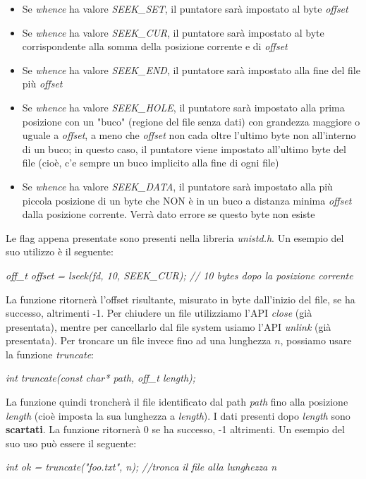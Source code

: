 \documentclass[12pt]{article}
\begin{document}
\begin{itemize}
    \item Se \textit{whence} ha valore \textit{SEEK\_SET}, il puntatore sarà impostato al byte \textit{offset}
    \item Se \textit{whence} ha valore \textit{SEEK\_CUR}, il puntatore sarà impostato al byte corrispondente alla somma della posizione corrente e di \textit{offset}
    \item Se \textit{whence} ha valore \textit{SEEK\_END}, il puntatore sarà impostato alla fine del file più \textit{offset}
    \item Se \textit{whence} ha valore \textit{SEEK\_HOLE}, il puntatore sarà impostato alla prima posizione con un "buco" (regione del file senza dati) con grandezza maggiore o uguale a \textit{offset}, a meno che \textit{offset} non cada oltre l'ultimo byte non all'interno di un buco; in questo caso, il puntatore viene impostato all'ultimo byte del file (cioè, c'e sempre un buco implicito alla fine di ogni file)
    \item Se \textit{whence} ha valore \textit{SEEK\_DATA}, il puntatore sarà impostato alla più piccola posizione di un byte che NON è in un buco a distanza minima \textit{offset} dalla posizione corrente. Verrà dato errore se questo byte non esiste
\end{itemize}
Le flag appena presentate sono presenti nella libreria \textit{unistd.h}.
Un esempio del suo utilizzo è il seguente:
\begin{center}
    \textit{off\_t offset = lseek(fd, 10, SEEK\_CUR); // 10 bytes dopo la posizione corrente}
\end{center}
La funzione ritornerà l'offset risultante, misurato in byte dall'inizio del file, se ha successo, altrimenti -1.
Per chiudere un file utilizziamo l'API \textit{close} (già presentata), mentre per cancellarlo dal file system usiamo l'API \textit{unlink} (già presentata).
Per troncare un file invece fino ad una lunghezza $n$, possiamo usare la funzione \textit{truncate}:
\begin{center}
    \textit{int truncate(const char* path, off\_t length);}
\end{center}
La funzione quindi troncherà il file identificato dal path \textit{path} fino alla posizione \textit{length} (cioè imposta la sua lunghezza a \textit{length}).
I dati presenti dopo \textit{length} sono \textbf{scartati}. La funzione ritornerà 0 se ha successo, -1 altrimenti. Un esempio del suo uso può essere il seguente:
\begin{center}
    \textit{int ok = truncate("foo.txt", n); //tronca il file alla lunghezza n}
\end{center}
\end{document}
